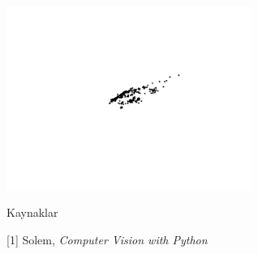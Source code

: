 \documentclass[12pt,fleqn]{article}\usepackage{../common}
\begin{document}
\includegraphics[height=6cm]{mvg_03.png}






















Kaynaklar

[1] Solem, {\em Computer Vision with Python}
\end{document}
